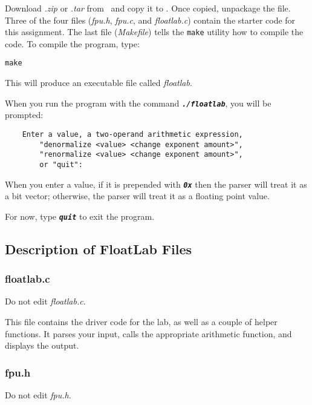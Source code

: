 Download \textit{\shortlabname.zip} or \textit{\shortlabname.tar} from \filesource\ and copy it to \runtimeenvironment.
Once copied, unpackage the file.
Three of the four files (\textit{fpu.h}, \textit{fpu.c}, and \textit{floatlab.c}) contain the starter code for this assignment.
The last file (\textit{Makefile}) tells the \texttt{make} utility how to compile the code.
To compile the program, type:

\texttt{make}

This will produce an executable file called \textit{floatlab}.

When you run the program with the command \texttt{\textbf{\textit{./floatlab}}}, you will be prompted:

\begin{verbatim}
    Enter a value, a two-operand arithmetic expression,
        "denormalize <value> <change exponent amount>",
        "renormalize <value> <change exponent amount>",
        or "quit":
\end{verbatim}

When you enter a value, if it is prepended with \texttt{\textbf{\textit{0x}}} then the parser will treat it as a bit vector;
otherwise, the parser will treat it as a floating point value.

For now, type \texttt{\textbf{\textit{quit}}} to exit the program.

\subsection{Description of FloatLab Files}

\subsubsection{floatlab.c}

Do not edit \textit{floatlab.c}.

This file contains the driver code for the lab, as well as a couple of helper functions.
It parses your input, calls the appropriate arithmetic function, and displays the output.

\subsubsection{fpu.h}\label{subsubsec:fpu.h}

Do not edit \textit{fpu.h}.

